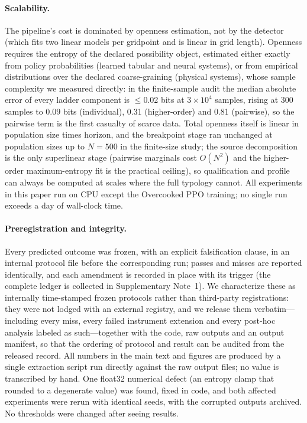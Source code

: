 \documentclass[11pt]{article}
\begin{document}
\paragraph{Scalability.}
The pipeline's cost is dominated by openness estimation, not by the
detector (which fits two linear models per gridpoint and is linear in
grid length). Openness requires the entropy of the declared
possibility object, estimated either exactly from policy
probabilities (learned tabular and neural systems), or from empirical
distributions over the declared coarse-graining (physical systems),
whose sample complexity we measured directly: in the finite-sample
audit the median absolute error of every ladder component is
$\leq$0.02 bits at $3\times10^{4}$ samples, rising at 300 samples to
0.09 bits (individual), 0.31 (higher-order) and 0.81 (pairwise), so
the pairwise term is the first casualty of scarce data. Total
openness itself is linear in population size times horizon, and the
breakpoint stage ran unchanged at population sizes up to $N{=}500$ in
the finite-size study; the source decomposition is the only
superlinear stage (pairwise marginals cost $O(N^{2})$ and the
higher-order maximum-entropy fit is the practical ceiling), so
qualification and profile can always be computed at scales where the
full typology cannot. All experiments in this paper run on CPU except
the Overcooked PPO training; no single run exceeds a day of
wall-clock time.

\paragraph{Preregistration and integrity.}
Every predicted outcome was frozen, with an explicit falsification
clause, in an internal protocol file before the corresponding run;
passes and misses are reported identically, and each amendment is
recorded in place with its trigger (the complete ledger is collected
in Supplementary Note~1). We characterize these as
internally time-stamped frozen protocols rather than third-party
registrations: they were not lodged with an external registry, and we
release them verbatim---including every miss, every failed instrument
extension and every post-hoc analysis labeled as such---together with
the code, raw outputs and an output manifest, so that the ordering of
protocol and result can be audited from the released record. All
numbers in the main text and figures are produced by a single
extraction script run directly against the raw output files; no value
is transcribed by hand. One float32 numerical defect (an entropy clamp
that rounded to a degenerate value) was found, fixed in code, and both
affected experiments were rerun with identical seeds, with the
corrupted outputs archived. No thresholds were changed after seeing
results.
\end{document}
